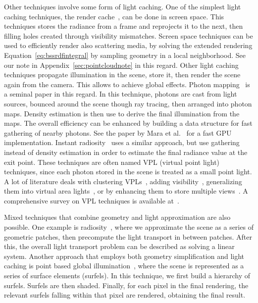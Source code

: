 Other techniques involve some form of light caching. One of the simplest light caching techniques, the render cache~\cite{Walter2002}, can be done in screen space. This techniques stores the radiance from a frame and reprojects it to the next, then filling holes created through visibility mismatches. Screen space techniques can be used to efficiently render also scattering media, by solving the extended rendering Equation~\ref{eq:bssrdfintegral} by sampling geometry in a local neighborhood. See our note in Appendix~\ref{sec:pointcloudnote} in this regard. Other light caching techniques propagate illumination in the scene, store it, then render the scene again from the camera. This allows to achieve global effects. Photon mapping~\cite{Jensen1996} is a seminal paper in this regard. In this technique, photons are cast from light sources, bounced around the scene though ray tracing, then arranged into photon maps. Density estimation is then use to derive the final illumination from the maps. The overall efficiency can be enhanced by building a data structure for fast gathering of nearby photons. See the paper by Mara et al.~\cite{Mara2013} for a fast GPU implementation. Instant radiosity~\cite{Keller1997} uses a similar approach, but use gathering instead of density estimation in order to estimate the final radiance value at the exit point. These techniques are often named VPL (virtual point light) techniques, since each photon stored in the scene is treated as a small point light. A lot of literature deals with clustering VPLs~\cite{Walter2005, Bus2015}, adding visibility~\cite{Ritschel2008}, generalizing them into virtual area lights~\cite{Dong09}, or by enhancing them to store multiple views~\cite{Simon2015}. A comprehensive survey on VPL techniques is available at~\cite{Dachsbacher2014}.

Mixed techniques that combine geometry and light approximation are also possible. One example is radiosity~\cite{Goral1984}, where we approximate the scene as a series of geometric patches, then precompute the light transport in between patches. After this, the overall light transport problem can be described as solving a linear system. Another approach that employs both geometry simplification and light caching is point based global illumination~\cite{Christensen2008}, where the scene is represented as a series of surface elements (surfels). In this technique, we first build a hierarchy of surfels. Surfels are then shaded. Finally, for each pixel in the final rendering, the relevant surfels falling within that pixel are rendered, obtaining the final result. 

